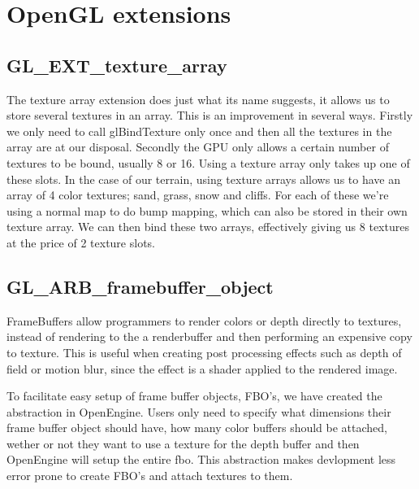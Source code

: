 \chapter{OpenGL extensions}
\label{sec:GLext}

\section{GL\_EXT\_texture\_array}

The texture array extension does just what its name suggests, it
allows us to store several textures in an array. This is an
improvement in several ways. Firstly we only need to call
glBindTexture only once and then all the textures in the array are at
our disposal. Secondly the GPU only allows a certain number of
textures to be bound, usually 8 or 16. Using a texture array only
takes up one of these slots. In the case of our terrain, using texture
arrays allows us to have an array of 4 color textures; sand, grass,
snow and cliffs. For each of these we're using a normal map to do
bump mapping, which can also be stored in their own texture array. We
can then bind these two arrays, effectively giving us 8 textures at
the price of 2 texture slots.

\section{GL\_ARB\_framebuffer\_object}

FrameBuffers allow programmers to render colors or depth directly to
textures, instead of rendering to the a renderbuffer and then performing
an expensive copy to texture. This is useful when creating post
processing effects such as depth of field or motion blur, since the
effect is a shader applied to the rendered image.


To facilitate easy setup of frame buffer objects, FBO's, we have
created the  abstraction in OpenEngine. Users only need to
specify what dimensions their frame buffer object should have, how
many color buffers should be attached, wether or not they want to use
a texture for the depth buffer and then OpenEngine will setup the
entire fbo. This abstraction makes devlopment less error prone to
create FBO's and attach textures to them.



